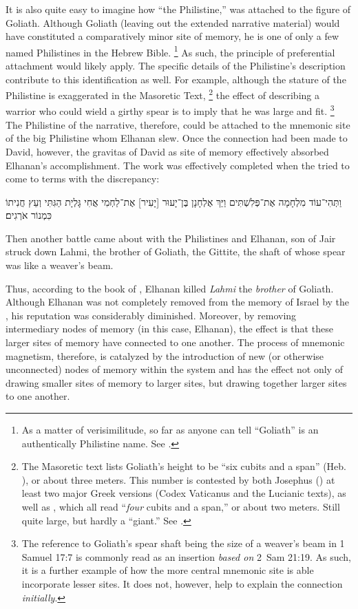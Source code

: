 It is also quite easy to imagine how ``the Philistine,'' was attached to the figure of Goliath. Although Goliath (leaving out the extended narrative material) would have constituted a comparatively minor site of memory, he is one of only a few named Philistines in the Hebrew Bible.%
    \footnote{As a matter of verisimilitude, so far as anyone can tell ``Goliath'' is an authentically Philistine name. See \autocite[291]{mccarter1980}.}
As such, the principle of preferential attachment would likely apply. The specific details of the Philistine's description contribute to this identification as well. For example, although the stature of the Philistine is exaggerated in the Masoretic Text,%
    \footnote{The Masoretic text lists Goliath's height to be ``six cubits and a span'' (Heb. ), or about three meters. This number is contested by both Josephus () at least two major Greek versions (Codex Vaticanus and the Lucianic texts), as well as , which all read ``\emph{four} cubits and a span,'' or about two meters. Still quite large, but hardly a ``giant.'' See \cite[286]{mccarter1980}.}
the effect of describing a warrior who could wield a girthy spear is to imply that he was large and fit.%
    \footnote{The reference to Goliath's spear shaft being the size of a weaver's beam in 1 Samuel 17:7 is commonly read as an insertion \emph{based on} 2~Sam 21:19. As such, it is a further example of how the more central mnemonic site is able incorporate lesser sites. It does not, however, help to explain the connection \emph{initially}.}
The Philistine of the narrative, therefore, could be attached to the mnemonic site of the big Philistine whom Elhanan slew. Once the connection had been made to David, however, the gravitas of David as site of memory effectively absorbed Elhanan's accomplishment. The work was effectively completed when the \chronicler tried to come to terms with the discrepancy:
\begin{hebrewtext}
    וַתְּהִי־עוֹד מִלְחָמָה אֶת־פְּלִשְׁתִּים וַיַּךְ אֶלְחָנָן בֶּן־יָעוּר [יָעִיר] אֶת־לַחְמִי אֲחִי גָּלְיָת הַגִּתִּי וְעֵץ חֲנִיתוֹ כִּמְנוֹר אֹרְגִים׃ 
\end{hebrewtext}
\begin{translation}
    Then another battle came about with the Philistines and Elhanan, son of Jair struck down Lahmi, the brother of Goliath, the Gittite, the shaft of whose spear was like a weaver's beam.
\end{translation}
\noindent
Thus, according to the book of \chronicles, Elhanan killed \emph{Lahmi} the \emph{brother} of Goliath. Although Elhanan was not completely removed from the memory of Israel by the \chronicler, his reputation was considerably diminished. Moreover, by removing intermediary nodes of memory (in this case, Elhanan), the effect is that these larger sites of memory have connected to one another. The process of mnemonic magnetism, therefore, is catalyzed by the introduction of new (or otherwise unconnected) nodes of memory within the system and has the effect not only of drawing smaller sites of memory to larger sites, but drawing together larger sites to one another.


